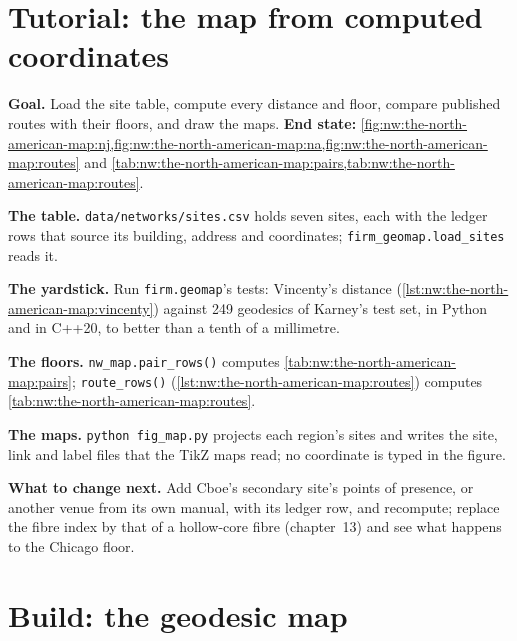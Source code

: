 \label{lst:nw:the-north-american-map:vincenty}

\section{Tutorial: the map from computed coordinates}\label{tut:nw:the-north-american-map:tut}

\begin{tutorial}
\textbf{Goal.} Load the site table, compute every distance and floor, compare published routes with their floors, and draw the maps.
\textbf{End state:} \cref{fig:nw:the-north-american-map:nj,fig:nw:the-north-american-map:na,fig:nw:the-north-american-map:routes} and
\cref{tab:nw:the-north-american-map:pairs,tab:nw:the-north-american-map:routes}.
\begin{tutsteps}
\item \textbf{The table.} \texttt{data/networks/sites.csv} holds seven sites, each with the ledger rows that source its building, address and
  coordinates; \texttt{firm\_geomap.load\_sites} reads it.
\item \textbf{The yardstick.} Run \texttt{firm.geomap}'s tests: Vincenty's distance
  (\cref{lst:nw:the-north-american-map:vincenty}) against 249 geodesics of Karney's test set, in Python and in C++20, to better than a tenth of a
  millimetre.
\item \textbf{The floors.} \texttt{nw\_map.pair\_rows()} computes \cref{tab:nw:the-north-american-map:pairs}; \texttt{route\_rows()}
  (\cref{lst:nw:the-north-american-map:routes}) computes \cref{tab:nw:the-north-american-map:routes}.
\item \textbf{The maps.} \texttt{python fig\_map.py} projects each region's sites and writes the site, link and label files that the TikZ
  maps read; no coordinate is typed in the figure.
\end{tutsteps}
\textbf{What to change next.} Add Cboe's secondary site's points of presence, or another venue from its own manual, with its ledger row, and
recompute; replace the fibre index by that of a hollow-core fibre (chapter~13) and see what happens to the Chicago floor.
\end{tutorial}

\section{Build: the geodesic map}\label{bld:nw:the-north-american-map:geomap}

